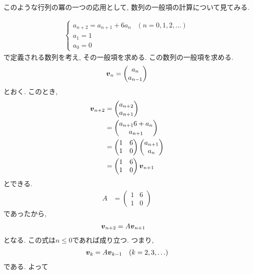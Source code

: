 このような行列の冪の一つの応用として, 数列の一般項の計算について見てみる.
\begin{example}
\begin{align*}
  \begin{cases}
    a_{n+2}=a_{n+1}+6a_n&(n=0,1,2,\ldots)\\
    a_{1}=1\\
    a_{0}=0
 \end{cases}
\end{align*}
で定義される数列を考え,
その一般項を求める.
この数列の一般項を求める.
\begin{align*}
  \boldsymbol{v}_n=\begin{pmatrix}a_{n}\\a_{n-1}\end{pmatrix}
\end{align*}
とおく.
このとき,
\begin{align*}
  \boldsymbol{v}_{n+2}
  &=\begin{pmatrix}a_{n+2}\\a_{n+1}\end{pmatrix}\\
  &=\begin{pmatrix}a_{n+1}6+a_n\\a_{n+1}\end{pmatrix}\\
  &=\begin{pmatrix}1&6\\1&0\end{pmatrix}\begin{pmatrix}a_{n+1}\\a_n\end{pmatrix}\\
  &=\begin{pmatrix}1&6\\1&0\end{pmatrix}\boldsymbol{v}_{n+1}
\end{align*}
とできる.
\begin{align*}
A
  &=\begin{pmatrix}1&6\\1&0\end{pmatrix}
\end{align*}
であったから,
\begin{align*}
  \boldsymbol{v}_{n+2}
  &=A\boldsymbol{v}_{n+1}
\end{align*}
となる.
この式は$n\leq 0$であれば成り立つ. つまり,
\begin{align*}
  \boldsymbol{v}_{k}
  &=A\boldsymbol{v}_{k-1} &(k=2,3,\ldots)
\end{align*}
である.
よって
\begin{align*}

\end{align*}
\end{example}
